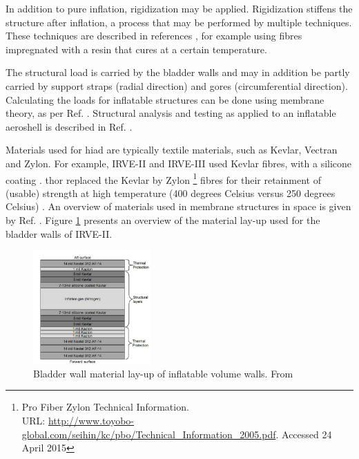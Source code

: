 In addition to pure inflation, rigidization may be applied. Rigidization stiffens the structure after inflation, a process that may be performed by multiple techniques. These techniques are described in references \cite{Freeland1998,Jenkins2001}, for example using fibres impregnated with a resin that cures at a certain temperature. 

The structural load is carried by the bladder walls and may in addition be partly carried by support straps (radial direction) and gores (circumferential direction). Calculating the loads for inflatable structures can be done using membrane theory, as per Ref. \cite{Young2002}. Structural analysis and testing as applied to an inflatable aeroshell is described in Ref. \cite{Lindell2006}.

Materials used for \gls{hiad} are typically textile materials, such as Kevlar, Vectran and Zylon. For example, IRVE-II and IRVE-III used Kevlar fibres, with a silicone coating \cite{Dillman2012a}. \gls{thor} replaced the Kevlar by Zylon \footnote{Pro Fiber Zylon Technical Information. \\ URL: \url{http://www.toyobo-global.com/seihin/kc/pbo/Technical\_Information\_2005.pdf}. Accessed 24 April 2015} fibres for their retainment of (usable) strength at high temperature (400 degrees Celsius versus 250 degrees Celsius) \cite{Dillman2014}. An overview of materials used in membrane structures in space is given by Ref. \cite{Jenkins2001}. Figure \ref{fig:matlayup} presents an overview of the material lay-up used for the bladder walls of IRVE-II.

\begin{figure}[H]
\centering
\includegraphics[width = 0.4\textwidth]{Figure/IRVE2_bladder_mat.PNG}
\caption{Bladder wall material lay-up of inflatable volume walls. From \cite[p.2]{Dillman2010}}
\label{fig:matlayup}
\end{figure}


